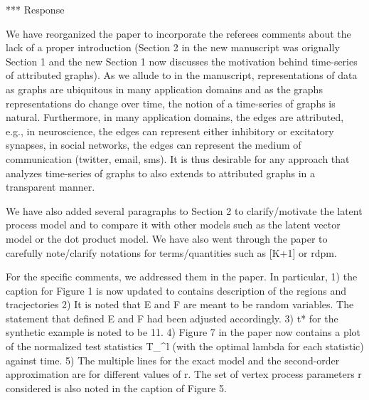 *** Response

We have reorganized the paper to incorporate the referees comments
about the lack of a proper introduction (Section 2 in the new
manuscript was orignally Section 1 and the new Section 1 now discusses
the motivation behind time-series of attributed graphs). As we allude
to in the manuscript, representations of data as
graphs are ubiquitous in many application
domains and as the graphs representations do change over time,
the notion of a time-series of graphs is natural. Furthermore, in many
application domains, the edges are attributed, e.g., in neuroscience,
the edges can represent either inhibitory or excitatory synapses, in
social networks, the edges can represent the medium of communication
(twitter, email, sms). It is thus desirable for 
any approach that analyzes time-series of
graphs to also extends to attributed graphs
in a transparent manner. 

We have also added several paragraphs to Section 2 to clarify/motivate the
latent process model and to compare it with other models such as the
latent vector model or the dot product model. We have also went
through the paper to carefully note/clarify notations for
terms/quantities such as [K+1] or rdpm. 

For the specific comments, we addressed them in the paper. In
particular, 
1) the caption for Figure 1 is now updated to contains
description of the regions and tracjectories 
2) It is noted that E and F are meant to be random variables. The
statement that defined E and F had been adjusted accordingly. 
3) t* for the synthetic example is noted to be 11.
4) Figure 7 in the paper now contains  a plot of the
normalized test statistics T_{\lambda}^{l} (with the optimal lambda
for each statistic) against time.
5) The multiple lines for the exact model and the second-order
approximation are for different values of r. The set of vertex process
parameters r considered is also noted in the caption of Figure 5.
